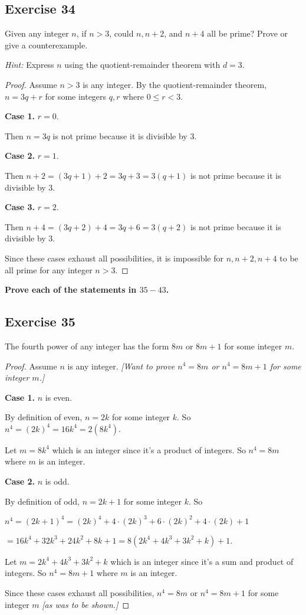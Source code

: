 \documentclass[14pt]{extarticle}
\newcommand{\cy}{\color{cyan}}
\begin{document}
\subsection{Exercise 34}
Given any integer $n$, if $n > 3$, could $n, n + 2$, and
$n + 4$ all be prime? Prove or give a counterexample.

    {\it Hint:} Express $n$ using the quotient-remainder theorem with $d = 3$.

\begin{proof}
    Assume $n>3$ is any integer. By the quotient-remainder theorem, $n = 3q+r$ for some integers $q,r$ where $0 \leq r < 3$.

        {\bf Case 1.} $r = 0$.

    Then $n = 3q$ is not prime because it is divisible by 3.

        {\bf Case 2.} $r = 1$.

    Then $n+2 = (3q+1)+2 = 3q+3 = 3(q+1)$ is not prime because it is divisible by 3.

        {\bf Case 3.} $r = 2$.

    Then $n+4 = (3q+2)+4 = 3q+6 = 3(q+2)$ is not prime because it is divisible by 3.

    Since these cases exhaust all possibilities, it is impossible for $n, n+2, n+4$ to be all prime for any integer $n>3$.
\end{proof}

{\bf \cy Prove each of the statements in $35-43$.}

\subsection{Exercise 35}
The fourth power of any integer has the form $8m$ or $8m + 1$ for some integer $m$.

\begin{proof}
    Assume $n$ is any integer. {\it [Want to prove $n^4 = 8m$ or $n^4 = 8m+1$ for some integer $m$.]}

        {\bf Case 1.} $n$ is even.

    By definition of even, $n = 2k$ for some integer $k$. So $n^4 = (2k)^4 = 16k^4 = 2(8k^4)$.

    Let $m = 8k^4$ which is an integer since it's a product of integers. So $n^4 = 8m$ where $m$ is an integer.

        {\bf Case 2.} $n$ is odd.

    By definition of odd, $n = 2k+1$ for some integer $k$. So

    $n^4 = (2k+1)^4 = (2k)^4 + 4 \cdot (2k)^3 + 6 \cdot (2k)^2 + 4 \cdot (2k) + 1$

    $= 16k^4 + 32k^3 + 24k^2 + 8k + 1 = 8(2k^4 + 4k^3 + 3k^2 + k) + 1$.

    Let $m = 2k^4 + 4k^3 + 3k^2 + k$ which is an integer since it's a sum and product of integers. So $n^4 = 8m + 1$ where $m$ is an integer.

    Since these cases exhaust all possibilities, $n^4 = 8m$ or $n^4 = 8m+1$ for some integer $m$ {\it [as was to be shown.]}
\end{proof}
\end{document}
